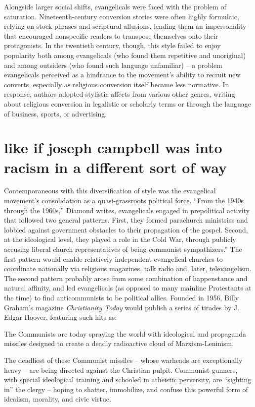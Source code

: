\documentclass[11pt]{article}
\begin{document}
Alongside larger social shifts, evangelicals were faced with the problem of saturation. Nineteenth-century conversion stories were often highly formulaic, relying on stock phrases and scriptural allusions, lending them an impersonality that encouraged nonspecific readers to transpose themselves onto their protagonists.\autocite[18]{Br91} In the twentieth century, though, this style failed to enjoy popularity both among evangelicals (who found them repetitive and unoriginal) and among outsiders (who found such language unfamiliar) -- a problem evangelicals perceived as a hindrance to the movement's ability to recruit new converts, especially as religious conversion itself became less normative.\autocite[73]{Br91} In response, authors adopted stylistic affects from various other genres, writing about religious conversion in legalistic or scholarly terms or through the language of business, sports, or advertising.\autocite[75]{Br91} 

\section*{like if joseph campbell was into racism in a different sort of way}

Contemporaneous with this diversification of style was the evangelical movement's consolidation as a quasi-grassroots political force. ``From the 1940s through the 1960s,'' Diamond writes, evangelicals engaged in prepolitical activity that followed two general patterns. First, they formed parachurch ministries and lobbied against government obstacles to their propagation of the gospel. Second, at the ideological level, they played a role in the Cold War, through publicly accusing liberal church representatives of being communist sympathizers.''\autocite[95]{Di95} The first pattern would enable relatively independent evangelical churches to coordinate nationally via religious magazines, talk radio and, later, televangelism. The second pattern probably arose from some combination of happenstance and natural affinity, and led evangelicals (as opposed to many mainline Protestants at the time) to find anticommunists to be political allies. Founded in 1956, Billy Graham's magazine \textit{Christianity Today} would publish a series of tirades by J. Edgar Hoover, featuring such hits as:
\begin{displayquote}
    The Communists are today spraying the world with ideological and propaganda missiles designed to create a deadly radioactive cloud of Marxism-Leninism.

    The deadliest of these Communist missiles -- whose warheads are exceptionally heavy -- are being directed against the Christian pulpit. Communist gunners, with special ideological training and schooled in atheistic perversity, are ``sighting in'' the clergy -- hoping to shatter, immobilize, and confuse this powerful form of idealism, morality, and civic virtue.\autocite[101]{Di95}
\end{displayquote}
\end{document}
